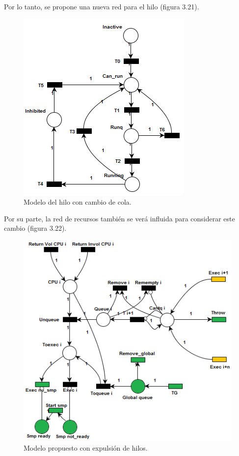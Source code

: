 \documentclass[a4paper]{book}
\begin{document}
Por lo tanto, se propone una nueva red para el hilo (figura 3.21).\\

\begin{figure} [H]
	\begin{center}
	    \includegraphics[scale=1]{./imagenes/it11modelohilo.png}
		\caption{Modelo del hilo con cambio de cola.}
	\end{center}
\end{figure}

Por su parte, la red de recursos tambi\'en se ver\'a influida para considerar este cambio (figura 3.22).

\begin{figure} [H]
	\begin{center}
	    \includegraphics[scale=0.95]{./imagenes/it11modelored.png}
		\caption{Modelo propuesto con expulsi\'on de hilos.}
	\end{center}
\end{figure}
\end{document}
